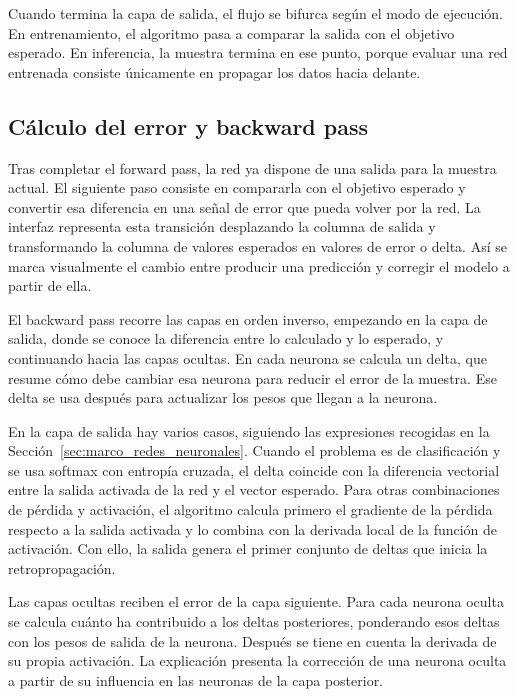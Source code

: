 Cuando termina la capa de salida, el flujo se bifurca según el modo de ejecución.
En entrenamiento, el algoritmo pasa a comparar la salida con el objetivo esperado.
En inferencia, la muestra termina en ese punto, porque evaluar una red entrenada consiste únicamente en propagar los datos hacia delante.


\subsection{Cálculo del error y backward pass}

Tras completar el forward pass, la red ya dispone de una salida para la muestra actual.
El siguiente paso consiste en compararla con el objetivo esperado y convertir esa diferencia en una señal de error que pueda volver por la red.
La interfaz representa esta transición desplazando la columna de salida y transformando la columna de valores esperados en valores de error o delta.
Así se marca visualmente el cambio entre producir una predicción y corregir el modelo a partir de ella.

El backward pass recorre las capas en orden inverso, empezando en la capa de salida, donde se conoce la diferencia entre lo calculado y lo esperado, y continuando hacia las capas ocultas.
En cada neurona se calcula un delta, que resume cómo debe cambiar esa neurona para reducir el error de la muestra.
Ese delta se usa después para actualizar los pesos que llegan a la neurona.

En la capa de salida hay varios casos, siguiendo las expresiones recogidas en la Sección~\ref{sec:marco_redes_neuronales}.
Cuando el problema es de clasificación y se usa softmax con entropía cruzada, el delta coincide con la diferencia vectorial entre la salida activada de la red y el vector esperado.
Para otras combinaciones de pérdida y activación, el algoritmo calcula primero el gradiente de la pérdida respecto a la salida activada y lo combina con la derivada local de la función de activación.
Con ello, la salida genera el primer conjunto de deltas que inicia la retropropagación.

Las capas ocultas reciben el error de la capa siguiente.
Para cada neurona oculta se calcula cuánto ha contribuido a los deltas posteriores, ponderando esos deltas con los pesos de salida de la neurona.
Después se tiene en cuenta la derivada de su propia activación.
La explicación presenta la corrección de una neurona oculta a partir de su influencia en las neuronas de la capa posterior.

